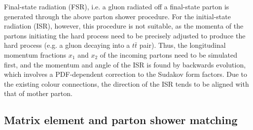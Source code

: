 Final-state radiation (FSR), i.e. a gluon radiated off a final-state parton is generated through the above parton shower procedure. For the initial-state radiation (ISR), however, this procedure is not suitable, as the momenta of the partons initiating the hard process need to be precisely adjusted to produce the hard process (e.g. a gluon decaying into a $t\bar{t}$ pair). Thus, the longitudinal momentum fractions $x_{1}$ and $x_{2}$ of the incoming partons need to be simulated first, and the momentum and angle of the ISR is found by backwards evolution, which involves a PDF-dependent correction to the Sudakov form factors. Due to the existing colour connections, the direction of the ISR tends to be aligned with that of mother parton.

\subsection{Matrix element and parton shower matching}

